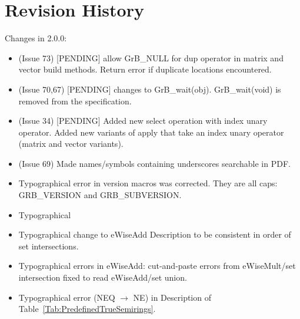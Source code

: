 \chapter{Revision History}
\label{Chp:RevHistory}

Changes in 2.0.0:
\begin{itemize}
\item (Issue 73) [PENDING] allow {\sf GrB\_NULL} for dup operator in matrix and vector {\sf build} methods.  Return error if duplicate locations encountered.
\item (Issue 70,67) [PENDING] changes to {\sf GrB\_wait(obj)}. {\sf GrB\_wait(void)} is removed from the specification.
\item (Issue 34) [PENDING] Added new select operation with index unary operator. Added new variants of apply that take an index unary operator (matrix and vector variants).
\item (Issue 69) Made names/symbols containing underscores searchable in PDF.
\item Typographical error in version macros was corrected.  They are all caps: {\sf GRB\_VERSION} and {\sf GRB\_SUBVERSION}.
\item Typographical
\item Typographical change to eWiseAdd Description to be consistent in order of set intersections.
\item Typographical errors in eWiseAdd: cut-and-paste errors from eWiseMult/set intersection fixed to read eWiseAdd/set union.
\item Typographical error ({\sf NEQ} $\rightarrow$ {\sf NE}) in Description of Table~\ref{Tab:PredefinedTrueSemirings}.
\end{itemize}


